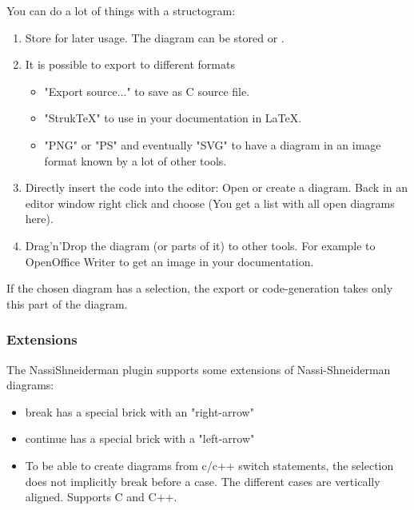 You can do a lot of things with a structogram:

\begin{enumerate}
\item Store for later usage. The diagram can be stored  or .
\item It is possible to export to different formats 
    \begin{itemize}
    \item "Export source..." to save as C source file.
    \item "StrukTeX" to use in your documentation in LaTeX.
    \item "PNG" or "PS" and eventually "SVG" to have a diagram in an image format known by a lot of other tools.
    \end{itemize}        
\item Directly insert the code into the editor: Open or create a diagram. Back in an editor window right click and choose  (You get a list with all open diagrams here).
\item Drag'n'Drop the diagram (or parts of it) to other tools. For example to OpenOffice Writer to get an image in your documentation.
\end{enumerate}

If the chosen diagram has a selection, the export or code-generation takes only this part of the diagram. 

\subsubsection{Extensions}

The NassiShneiderman plugin supports some extensions of Nassi-Shneiderman diagrams: 

\begin{itemize}
\item break has a special brick with an "right-arrow"
\item continue has a special brick with a "left-arrow"
\item To be able to create diagrams from c/c++ switch statements, the selection does not implicitly break before a case. The different cases are vertically aligned. Supports C and C++.
\end{itemize}

